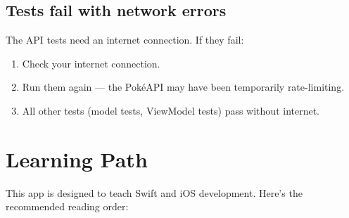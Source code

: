 \documentclass[11pt,a4paper]{article}
\newenvironment{tightenumerate}
{\begin{enumerate}\setlength{\itemsep}{2pt}\setlength{\parskip}{0pt}}
{\end{enumerate}}
\begin{document}
\subsection{Tests fail with network errors}

The API tests need an internet connection. If they fail:

\begin{tightenumerate}
    \item Check your internet connection.
    \item Run them again — the Pok\'{e}API may have been temporarily rate-limiting.
    \item All other tests (model tests, ViewModel tests) pass without internet.
\end{tightenumerate}

\section{Learning Path}

This app is designed to teach Swift and iOS development. Here's the recommended reading order:
\end{document}
